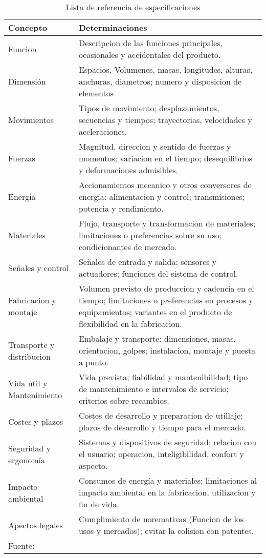 \begin{longtable}{|>{\columncolor[gray]{0.85}}p{}|p{}|}
    \cline{1-2} \rowcolor[gray]{0.85}
    \textbf{Concepto} & \textbf{Determinaciones } \\ \hline \endhead
    Funcion     & Descripcion de las funciones principales, ocasionales y accidentales del producto.\\ \cline{1-2}
    Dimensión   & Espacios, Volumenes, masas, longitudes, alturas, anchuras, diametros; numero y disposicion de elementos \\ \cline{1-2}
    Movimientos & Tipos de movimiento; desplazamientos, secuencias y tiempos; trayectorias, velocidades y aceleraciones.\\ \cline{1-2}
    Fuerzas     & Magnitud, direccion y sentido de fuerzas y momentos; variacion en el tiempo; desequilibrios y deformaciones admisibles.\\ \cline{1-2}
    Energia     & Accionamientos mecanico y otros conversores de energia: alimentacion y control; transmisiones; potencia y rendimiento.\\ \cline{1-2}
    Materiales  & Flujo, transporte y transformacion de materiales; limitaciones o preferencias sobre su uso; condicionantes de mercado.\\ \cline{1-2}
    Señales y control & Señales de entrada y salida; sensores y actuadores; funciones del sistema de control.\\ \cline{1-2}
    Fabricacion y montaje & Volumen previsto de produccion y cadencia en el tiempo; limitaciones o preferencias en procesos y equipamientos; variantes en el producto de flexibilidad en la fabricacion.\\ \cline{1-2}
    Transporte y distribucion & Embalaje y transporte: dimensiones, masas, orientacion, golpes; instalacion, montaje y puesta a punto.\\ \cline{1-2}
    Vida util y Mantenimiento & Vida prevista; fiabilidad y mantenibilidad; tipo de mantenimiento e intervalos de servicio; criterios sobre recambios.\\ \cline{1-2}
    Costes y plazos & Costes de desarrollo y preparacion de utillaje; plazos de desarrollo y tiempo para el mercado.\\ \cline{1-2}
    Seguridad y ergonomía & Sistemas y dispositivos de seguridad; relacion con el usuario; operacion, inteligibilidad, confort y aspecto.\\ \cline{1-2}
    Impacto ambiental & Consumos de energía y materiales; limitaciones al impacto ambiental en la fabricacion, utilizacion y fin de vida.\\ \cline{1-2}
    Apectos legales & Cumplimiento de noremativas (Funcion de los usos y mercados); evitar la colision con patentes.\\ \cline{1-2}
    
    
    \caption{Lista de referencia de especificaciones}{Fuente: \cite{Riba2002}}
\end{longtable}